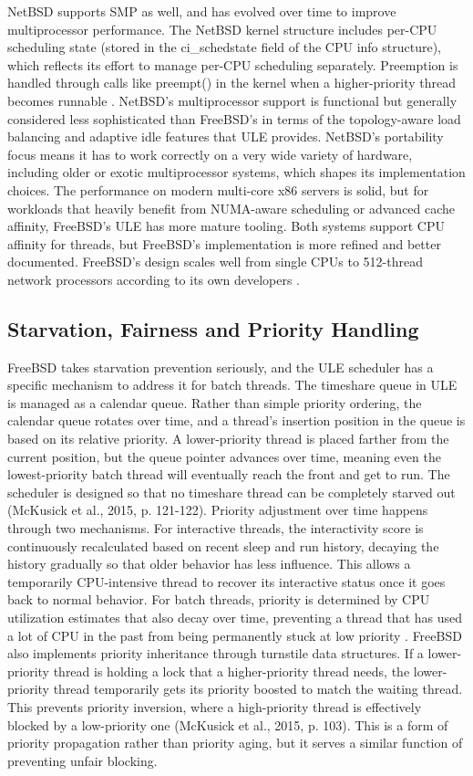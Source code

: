 NetBSD supports SMP as well, and has evolved over time to improve multiprocessor performance. The NetBSD kernel structure includes per-CPU scheduling state (stored in the ci\_schedstate field of the CPU info structure), which reflects its effort to manage per-CPU scheduling separately. Preemption is handled through calls like preempt() in the kernel when a higher-priority thread becomes runnable \parencite{netBSDnd}.
NetBSD's multiprocessor support is functional but generally considered less sophisticated than FreeBSD's in terms of the topology-aware load balancing and adaptive idle features that ULE provides. NetBSD's portability focus means it has to work correctly on a very wide variety of hardware, including older or exotic multiprocessor systems, which shapes its implementation choices. The performance on modern multi-core x86 servers is solid, but for workloads that heavily benefit from NUMA-aware scheduling or advanced cache affinity, FreeBSD's ULE has more mature tooling.
Both systems support CPU affinity for threads, but FreeBSD's implementation is more refined and better documented. FreeBSD's design scales well from single CPUs to 512-thread network processors according to its own developers \parencite{watson2015}.

\subsection{Starvation, Fairness and Priority Handling}
FreeBSD takes starvation prevention seriously, and the ULE scheduler has a specific mechanism to address it for batch threads. The timeshare queue in ULE is managed as a calendar queue. Rather than simple priority ordering, the calendar queue rotates over time, and a thread's insertion position in the queue is based on its relative priority. A lower-priority thread is placed farther from the current position, but the queue pointer advances over time, meaning even the lowest-priority batch thread will eventually reach the front and get to run. The scheduler is designed so that no timeshare thread can be completely starved out (McKusick et al., 2015, p. 121-122).
Priority adjustment over time happens through two mechanisms. For interactive threads, the interactivity score is continuously recalculated based on recent sleep and run history, decaying the history gradually so that older behavior has less influence. This allows a temporarily CPU-intensive thread to recover its interactive status once it goes back to normal behavior. For batch threads, priority is determined by CPU utilization estimates that also decay over time, preventing a thread that has used a lot of CPU in the past from being permanently stuck at low priority \parencite{watson2015}.
FreeBSD also implements priority inheritance through turnstile data structures. If a lower-priority thread is holding a lock that a higher-priority thread needs, the lower-priority thread temporarily gets its priority boosted to match the waiting thread. This prevents priority inversion, where a high-priority thread is effectively blocked by a low-priority one (McKusick et al., 2015, p. 103). This is a form of priority propagation rather than priority aging, but it serves a similar function of preventing unfair blocking.

